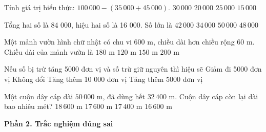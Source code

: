 \begin{ex} %
Tính giá trị biểu thức: $100\,000 - (35\,000 + 45\,000)$.
\choice
{$30\,000$}
{\True $20\,000$}
{$25\,000$}
{$15\,000$}
\end{ex}

\begin{ex} %
Tổng hai số là 84 000, hiệu hai số là 16 000. Số lớn là
\choice
{$42\,000$}
{$34\,000$}
{\True $50\,000$}
{$48\,000$}
\end{ex}

\begin{ex} %
Một mảnh vườn hình chữ nhật có chu vi $600\text{ m}$, chiều dài hơn chiều rộng $60\text{ m}$. Chiều dài của mảnh vườn là
\choice
{\True $180\text{ m}$}
{$120\text{ m}$}
{$150\text{ m}$}
{$200\text{ m}$}
\end{ex}

\begin{ex} %
Nếu số bị trừ tăng 5000 đơn vị và số trừ giữ nguyên thì hiệu sẽ
\choice
{Giảm đi 5000 đơn vị}
{Không đổi}
{Tăng thêm 10 000 đơn vị}
{\True Tăng thêm 5000 đơn vị}
\end{ex}

\begin{ex} %
Một cuộn dây cáp dài $50\,000\text{ m}$, đã dùng hết $32\,400\text{ m}$. Cuộn dây cáp còn lại dài bao nhiêu mét?
\choice
{$18\,600\text{ m}$}
{\True $17\,600\text{ m}$}
{$17\,400\text{ m}$}
{$16\,600\text{ m}$}
\end{ex}

\textbf{Phần 2. Trắc nghiệm đúng sai}

